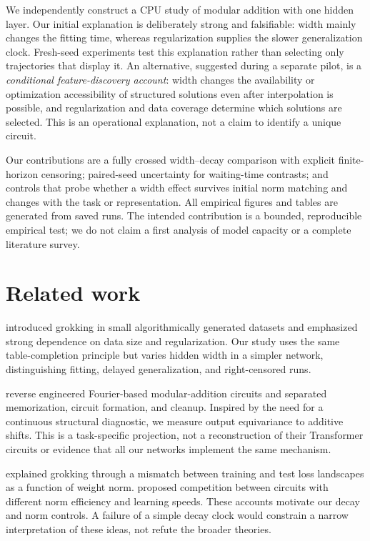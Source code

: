 \documentclass{article}
\begin{document}
We independently construct a CPU study of modular addition with one hidden layer. Our initial explanation is deliberately strong and falsifiable: width mainly changes the fitting time, whereas regularization supplies the slower generalization clock. Fresh-seed experiments test this explanation rather than selecting only trajectories that display it. An alternative, suggested during a separate pilot, is a \emph{conditional feature-discovery account}: width changes the availability or optimization accessibility of structured solutions even after interpolation is possible, and regularization and data coverage determine which solutions are selected. This is an operational explanation, not a claim to identify a unique circuit.

Our contributions are a fully crossed width--decay comparison with explicit finite-horizon censoring; paired-seed uncertainty for waiting-time contrasts; and controls that probe whether a width effect survives initial norm matching and changes with the task or representation. All empirical figures and tables are generated from saved runs. The intended contribution is a bounded, reproducible empirical test; we do not claim a first analysis of model capacity or a complete literature survey.

\section{Related work}
\citet{power2022} introduced grokking in small algorithmically generated datasets and emphasized strong dependence on data size and regularization. Our study uses the same table-completion principle but varies hidden width in a simpler network, distinguishing fitting, delayed generalization, and right-censored runs.

\citet{nanda2023} reverse engineered Fourier-based modular-addition circuits and separated memorization, circuit formation, and cleanup. Inspired by the need for a continuous structural diagnostic, we measure output equivariance to additive shifts. This is a task-specific projection, not a reconstruction of their Transformer circuits or evidence that all our networks implement the same mechanism.

\citet{liu2023} explained grokking through a mismatch between training and test loss landscapes as a function of weight norm. \citet{varma2023} proposed competition between circuits with different norm efficiency and learning speeds. These accounts motivate our decay and norm controls. A failure of a simple decay clock would constrain a narrow interpretation of these ideas, not refute the broader theories.
\end{document}
